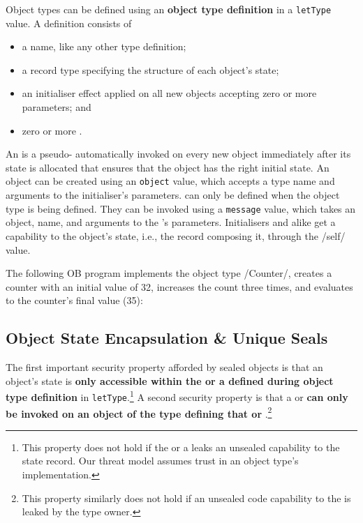 \documentclass[main.tex]{subfiles}
\begin{document}
Object types can be defined using an \textbf{object type definition} in a \texttt{letType} value. A definition consists of
\begin{itemize}[nosep]
	\item a name, like any other type definition;
	\item a record type specifying the structure of each object's state;
	\item an initialiser effect applied on all new objects accepting zero or more parameters; and
	\item zero or more .
\end{itemize}

An \textbf{} is a pseudo- automatically invoked on every new object immediately after its state is allocated that ensures that the object has the right initial state. An object can be created using an \texttt{object} value, which accepts a type name and arguments to the initialiser's parameters.  can only be defined when the object type is being defined. They can be invoked using a \texttt{message} value, which takes an object,  name, and arguments to the 's parameters. Initialisers and  alike get a capability to the object's state, i.e., the record composing it, through the \iil/self/ value.

The following OB program implements the object type \iil/Counter/, creates a counter with an initial value of 32, increases the count three times, and evaluates to the counter's final value (35):

\subsection{Object State Encapsulation \& Unique Seals} \label{sct:obj-sec}
The first important security property afforded by sealed objects is that an object's state is \textbf{only accessible within the  or a  defined during object type definition} in \texttt{letType}.\footnote{This property does not hold if the  or a  leaks an unsealed capability to the state record. Our threat model assumes trust in an object type's implementation.} A second security property is that a  or  \textbf{can only be invoked on an object of the type defining that  or }.\footnote{This property similarly does not hold if an unsealed code capability to the  is leaked by the type owner.}
\end{document}
